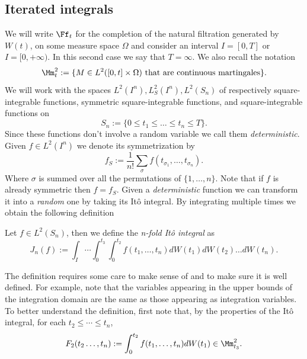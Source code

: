 \documentclass[
    a4paper,
    DIV=14,
    abstract=true,
    numbers=noenddot
]{scrartcl}
\begin{document}
\subsection{Iterated integrals}
We will write $\Ff_t$ for the completion of the natural filtration generated by $W(t)$, on some measure space  $\Omega$ and consider an interval $I=[0,T]$ or  $I=[0,+\infty)$. In this second case we say that $T=\infty.$ We also recall the notation
\begin{equation*}
	\Mm_t^2:=\{M\in L^2([0,t]\times\Omega)\text{ that are continuous martingales}\}.
\end{equation*}
We will work with the spaces $L^2(I^n), L^2_S(I^n), L^2(S_n)$ of respectively square-integrable functions, symmetric square-integrable functions, and square-integrable functions on
\begin{equation*}
	S_n:=\{0\leq t_1\leq\ldots\leq t_n\leq T\}.
\end{equation*}
Since these functions don't involve a random variable we call them \emph{deterministic}. Given $f\in L^2(I^n)$ we denote its symmetrization by
\begin{equation*}
	f_S:=\frac{1}{n!}\sum_{\sigma} f(t_{\sigma_1},\ldots,t_{\sigma_n}).
\end{equation*}
Where $\sigma$ is summed over all the permutations of $\{1,\ldots,n\}$.
Note that if $f$ is already symmetric then  $f=f_S$. Given a \emph{deterministic} function we can transform it into a \emph{random} one by taking its Itô integral. By integrating multiple times we obtain the following definition
\begin{definition}
	Let $f\in L^2(S_n)$, then we define the \emph{n-fold Itô integral} as
	\begin{equation*}
		J_n(f):=\int_I\cdots \int_{0}^{t_3}\int_{0}^{t_2} f(t_1,\ldots,t_n)dW(t_1) dW(t_2)\ldots dW(t_n).
	\end{equation*}

\end{definition}
The definition requires some care to make sense of and to make sure it is well defined. For example, note that the variables appearing in the upper bounds of the integration domain are the same as those appearing as integration variables. To better understand the definition, first note that, by the properties of the Itô integral, for each $t_2\leq\cdots\leq t_n$,
\begin{equation*}
	F_2(t_2\ldots,t_n):=	\int_{0}^{t_2} f(t_1,\ldots,t_n)dW(t_1) \in \Mm_{t_3}^2.
\end{equation*}
\end{document}
